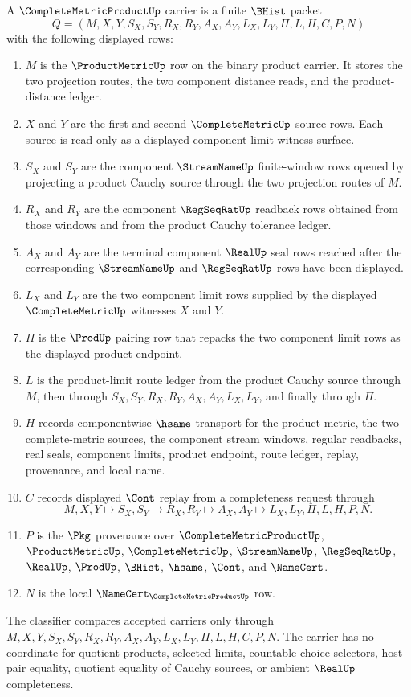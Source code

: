 \begin{definition}
\label{def:complete-metric-product-carrier}
A $\CompleteMetricProductUp$ carrier is a finite $\BHist$ packet
$$
Q=(M,X,Y,S_X,S_Y,R_X,R_Y,A_X,A_Y,L_X,L_Y,\Pi,L,H,C,P,N)
$$
with the following displayed rows:
\begin{enumerate}
\item $M$ is the $\ProductMetricUp$ row on the binary product carrier. It
stores the two projection routes, the two component distance reads, and the
product-distance ledger.
\item $X$ and $Y$ are the first and second $\CompleteMetricUp$ source rows.
Each source is read only as a displayed component limit-witness surface.
\item $S_X$ and $S_Y$ are the component $\StreamNameUp$ finite-window rows
opened by projecting a product Cauchy source through the two projection routes
of $M$.
\item $R_X$ and $R_Y$ are the component $\RegSeqRatUp$ readback rows obtained
from those windows and from the product Cauchy tolerance ledger.
\item $A_X$ and $A_Y$ are the terminal component $\RealUp$ seal rows reached
after the corresponding $\StreamNameUp$ and $\RegSeqRatUp$ rows have been
displayed.
\item $L_X$ and $L_Y$ are the two component limit rows supplied by the
displayed $\CompleteMetricUp$ witnesses $X$ and $Y$.
\item $\Pi$ is the $\ProdUp$ pairing row that repacks the two component limit
rows as the displayed product endpoint.
\item $L$ is the product-limit route ledger from the product Cauchy source
through $M$, then through $S_X,S_Y,R_X,R_Y,A_X,A_Y,L_X,L_Y$, and finally
through $\Pi$.
\item $H$ records componentwise $\hsame$ transport for the product metric,
the two complete-metric sources, the component stream windows, regular
readbacks, real seals, component limits, product endpoint, route ledger,
replay, provenance, and local name.
\item $C$ records displayed $\Cont$ replay from a completeness request through
$$
M,X,Y \longmapsto S_X,S_Y \longmapsto R_X,R_Y
\longmapsto A_X,A_Y \longmapsto L_X,L_Y,\Pi,L,H,P,N .
$$
\item $P$ is the $\Pkg$ provenance over $\CompleteMetricProductUp$,
$\ProductMetricUp$, $\CompleteMetricUp$, $\StreamNameUp$, $\RegSeqRatUp$,
$\RealUp$, $\ProdUp$, $\BHist$, $\hsame$, $\Cont$, and $\NameCert$.
\item $N$ is the local $\NameCert_{\CompleteMetricProductUp}$ row.
\end{enumerate}
The classifier compares accepted carriers only through
$M,X,Y,S_X,S_Y,R_X,R_Y,A_X,A_Y,L_X,L_Y,\Pi,L,H,C,P,N$. The carrier has no
coordinate for quotient products, selected limits, countable-choice
selectors, host pair equality, quotient equality of Cauchy sources, or
ambient $\RealUp$ completeness.
\end{definition}

